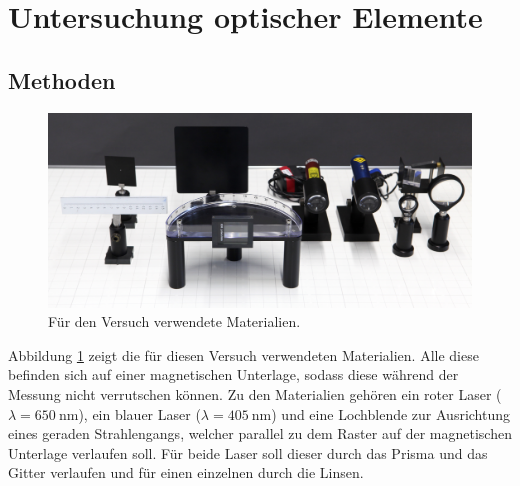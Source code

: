 \section{Untersuchung optischer Elemente}
	
	\subsection{Methoden}
		
			\begin{figure}[ht]
				\centering
				\includegraphics[width=\textwidth]{bilder/aufbau2.jpg}
			 	\caption{Für den Versuch verwendete Materialien.\cite{WWU}}
			 	\label{fig:Aufbau2}	
			\end{figure}
			Abbildung \ref{fig:Aufbau2} zeigt die für diesen Versuch verwendeten Materialien.
			Alle diese befinden sich auf einer magnetischen Unterlage, sodass diese während der Messung nicht verrutschen können.
			Zu den Materialien gehören ein roter Laser ($\lambda = \SI{650}{\nano\meter}$), ein blauer Laser ($\lambda = \SI{405}{\nano\meter}$) und eine Lochblende zur Ausrichtung eines geraden Strahlengangs, welcher parallel zu dem Raster auf der magnetischen Unterlage verlaufen soll.
			Für beide Laser soll dieser durch das Prisma und das Gitter verlaufen und für einen einzelnen durch die Linsen. %
			
